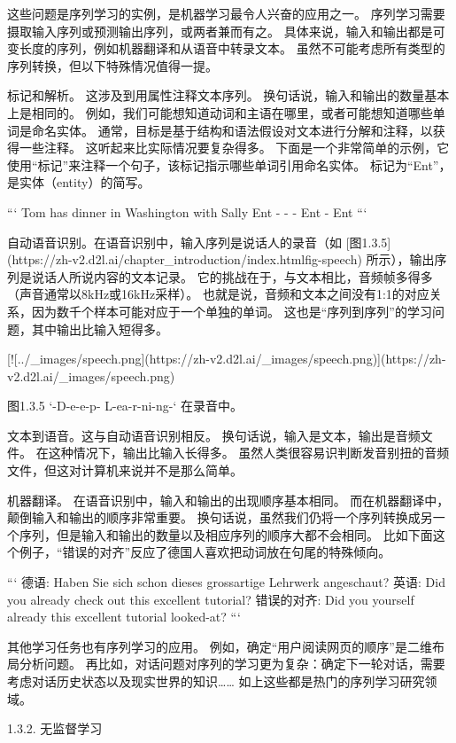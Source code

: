 这些问题是序列学习的实例，是机器学习最令人兴奋的应用之一。 序列学习需要摄取输入序列或预测输出序列，或两者兼而有之。 具体来说，输入和输出都是可变长度的序列，例如机器翻译和从语音中转录文本。 虽然不可能考虑所有类型的序列转换，但以下特殊情况值得一提。

标记和解析。
这涉及到用属性注释文本序列。 换句话说，输入和输出的数量基本上是相同的。 例如，我们可能想知道动词和主语在哪里，或者可能想知道哪些单词是命名实体。 通常，目标是基于结构和语法假设对文本进行分解和注释，以获得一些注释。 这听起来比实际情况要复杂得多。 下面是一个非常简单的示例，它使用“标记”来注释一个句子，该标记指示哪些单词引用命名实体。 标记为“Ent”，是实体（entity）的简写。

```
Tom has dinner in Washington with Sally
Ent  -    -    -     Ent      -    Ent
```

自动语音识别。在语音识别中，输入序列是说话人的录音（如 [图1.3.5]
(https://zh-v2.d2l.ai/chapter\_introduction/index.htmlfig-speech) 
所示），输出序列是说话人所说内容的文本记录。 它的挑战在于，与文本相比，音频帧多得多（声音通常以8kHz或16kHz采样）。 也就是说，音频和文本之间没有1:1的对应关系，因为数千个样本可能对应于一个单独的单词。 这也是“序列到序列”的学习问题，其中输出比输入短得多。

[![../\_images/speech.png](https://zh-v2.d2l.ai/\_images/speech.png)](https://zh-v2.d2l.ai/\_images/speech.png)

图1.3.5 `-D-e-e-p- L-ea-r-ni-ng-` 在录音中。

文本到语音。这与自动语音识别相反。 换句话说，输入是文本，输出是音频文件。 在这种情况下，输出比输入长得多。 虽然人类很容易识判断发音别扭的音频文件，但这对计算机来说并不是那么简单。

机器翻译。 在语音识别中，输入和输出的出现顺序基本相同。 而在机器翻译中，颠倒输入和输出的顺序非常重要。 换句话说，虽然我们仍将一个序列转换成另一个序列，但是输入和输出的数量以及相应序列的顺序大都不会相同。 比如下面这个例子，“错误的对齐”反应了德国人喜欢把动词放在句尾的特殊倾向。

```
德语:           Haben Sie sich schon dieses grossartige Lehrwerk angeschaut?
英语:          Did you already check out this excellent tutorial?
错误的对齐:  Did you yourself already this excellent tutorial looked-at?
```

其他学习任务也有序列学习的应用。 例如，确定“用户阅读网页的顺序”是二维布局分析问题。 再比如，对话问题对序列的学习更为复杂：确定下一轮对话，需要考虑对话历史状态以及现实世界的知识…… 如上这些都是热门的序列学习研究领域。

 1.3.2. 无监督学习

